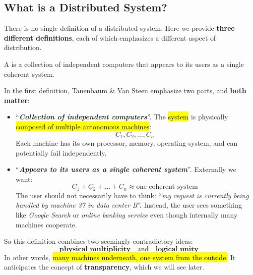 \subsection{What is a Distributed System?}\label{subsec:introduction--what-is-a-distributed-system}

There is no single definition of a distributed system. Here we provide \textbf{three different definitions}, each of which emphasizes a different aspect of distribution.

\highspace
\begin{definitionbox}
    A  is a collection of independent computers that appears to its users as a single coherent system.
\end{definitionbox}

\highspace
In the first definition, Tanenbaum \& Van Steen emphasize two parts, and \textbf{both matter}:
\begin{itemize}
    \item ``\emph{\textbf{Collection of independent computers}}''. The \hl{system} is physically \hl{composed of multiple autonomous machines}:
        \begin{equation*}
            C_1, C_2, \ldots, C_n
        \end{equation*}
        Each machine has its own processor, memory, operating system, and can potentially fail independently.

    \item ``\emph{\textbf{Appears to its users as a single coherent system}}''. Externally we want:
        \begin{equation*}
            C_1 + C_2 + \ldots + C_n \approx \text{one coherent system}
        \end{equation*}
        The user should not necessarily have to think: ``\emph{my request is currently being handled by machine 37 in data center B}''. Instead, the user sees something like \emph{Google Search} or \emph{online banking service} even though internally many machines cooperate.
\end{itemize}
So this definition combines two seemingly contradictory ideas:
\begin{equation*}
    \textbf{physical multiplicity} \quad \text{and} \quad \textbf{logical unity}
\end{equation*}
In other words, \hl{many machines underneath, one system from the outside.} It anticipates the concept of \textbf{transparency}, which we will see later.

